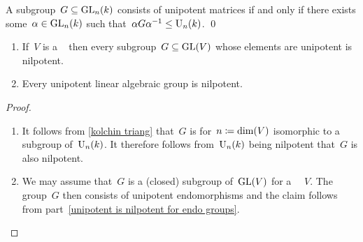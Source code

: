 \begin{corollary}
  A subgroup~$G \subseteq \operatorname{GL}_n(k)$ consists of unipotent matrices if and only if there exists some~$\alpha \in \operatorname{GL}_n(k)$ such that~$\alpha G \alpha^{-1} \leq \operatorname{U}_n(k)$.
  \qed
\end{corollary}


\begin{corollary}
  \leavevmode
  \begin{enumerate}
    \item
      \label{unipotent is nilpotent for endo groups}
      If~$V$ is a {\fd}~{\kvs} then every subgroup~$G \subseteq \operatorname{GL}(V)$ whose elements are unipotent is nilpotent.
    \item
      Every unipotent linear algebraic group is nilpotent.
  \end{enumerate}
\end{corollary}


\begin{proof}
  \leavevmode
  \begin{enumerate}
    \item
      It follows from \cref{kolchin triang} that~$G$ is for~$n \coloneqq \dim(V)$ isomorphic to a subgroup of~$\operatorname{U}_n(k)$.
      It therefore follows from~$\operatorname{U}_n(k)$ being nilpotent that~$G$ is also nilpotent.
    \item
      We may assume that~$G$ is a (closed) subgroup of~$\operatorname{GL}(V)$ for a {\fd}~{\kvs}~$V$.
      The group~$G$ then consists of unipotent endomorphisms and the claim follows from part~\ref*{unipotent is nilpotent for endo groups}.
    \qedhere
  \end{enumerate}
\end{proof}




